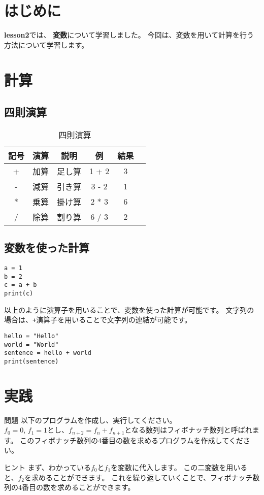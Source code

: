 \documentclass[a4paper,titlepage,dvipdfmx]{jarticle}
\begin{document}
\section{はじめに}
\textbf{lesson2}では、
\textbf{変数}について学習しました。
今回は、変数を用いて計算を行う方法について学習します。
\section{計算}
\subsection{四則演算}
\begin{table}[H]
  \centering
  \caption{四則演算}
  \begin{tabular}{|c|c|c|c|c|c|}
    \hline
    記号 & 演算 & 説明  & 例     & 結果 \\ \hline
    +  & 加算 & 足し算 & 1 + 2 & 3  \\ \hline
    -  & 減算 & 引き算 & 3 - 2 & 1  \\ \hline
    *  & 乗算 & 掛け算 & 2 * 3 & 6  \\ \hline
    /  & 除算 & 割り算 & 6 / 3 & 2  \\ \hline
  \end{tabular}
\end{table}
\subsection{変数を使った計算}
\begin{lstlisting}[caption=変数を使った計算,label=変数を使った計算]
a = 1
b = 2
c = a + b
print(c)
\end{lstlisting}
以上のように演算子を用いることで、変数を使った計算が可能です。
文字列の場合は、\texttt{+}演算子を用いることで文字列の連結が可能です。
\begin{lstlisting}[caption=文字列の連結,label=文字列の連結]
hello = "Hello"
world = "World"
sentence = hello + world
print(sentence)
\end{lstlisting}
\section{実践}
\begin{itembox}[l]{問題}
  以下のプログラムを作成し、実行してください。\\
  $f_{0}=0$, $f_{1}=1$とし、$f_{n+2}=f_{n}+f_{n+1}$となる数列はフィボナッチ数列と呼ばれます。
  このフィボナッチ数列の4番目の数を求めるプログラムを作成してください。
\end{itembox}
\begin{itembox}[l]{ヒント}
  まず、わかっている$f_{0}$と$f_{1}$を変数に代入します。
  この二変数を用いると、$f_{2}$を求めることができます。
  これを繰り返していくことで、フィボナッチ数列の4番目の数を求めることができます。
\end{itembox}
\end{document}
